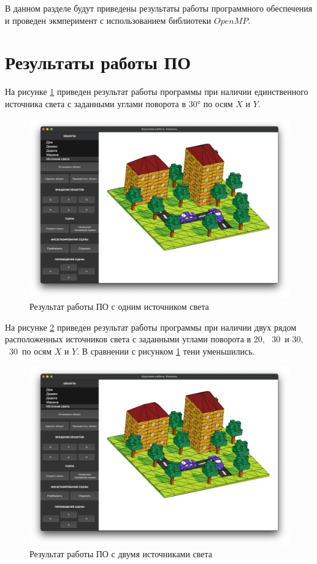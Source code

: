 \documentclass[a4paper,14pt, unknownkeysallowed]{extreport}
\begin{document}
В данном разделе будут приведены результаты работы программного обеспечения и проведен экмперимент с использованием библиотеки $OpenMP$.

\section{Результаты работы ПО}

На рисунке \ref{fig:example} приведен результат работы программы при наличии единственного источника света с заданными углами поворота в 30° по осям $X$ и $Y$.

\begin{figure}[h]
	\centering
	\includegraphics[scale=0.36]{img/example.png}
	\caption{Результат работы ПО с одним источником света}
	\label{fig:example}
\end{figure} 

\clearpage

На рисунке \ref{fig:example2} приведен результат работы программы при наличии двух рядом расположенных источников света с заданными углами поворота в 20\textdegree, \ 30\textdegree \ и 30\textdegree, \ 30\textdegree \ по осям $X$ и $Y$. В сравнении с рисунком \ref{fig:example} тени уменьшились.

\begin{figure}[h]
	\centering
	\includegraphics[scale=0.36]{img/example2.png}
	\caption{Результат работы ПО с двумя источниками света}
	\label{fig:example2}
\end{figure} 
\end{document}
